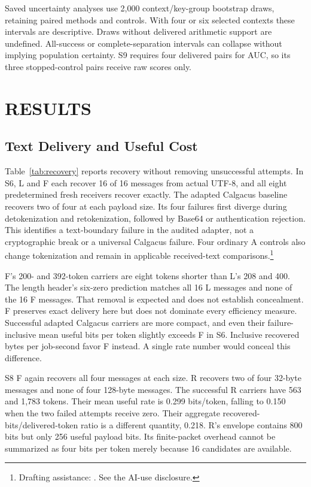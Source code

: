 \documentclass[a4paper,twoside]{article}
\newcommand{\aidraft}{\footnote{Drafting assistance: \cite{openai2026codex}. See the AI-use disclosure.}}
\begin{document}
Saved uncertainty analyses use 2,000 context/key-group bootstrap draws, retaining paired methods and controls. With four or six selected contexts these intervals are descriptive. Draws without delivered arithmetic support are undefined. All-success or complete-separation intervals can collapse without implying population certainty. S9 requires four delivered pairs for AUC, so its three stopped-control pairs receive raw scores only.

\section{RESULTS}
\label{sec:results}
\subsection{Text Delivery and Useful Cost}
\noindent Table~\ref{tab:recovery} reports recovery without removing unsuccessful attempts. In S6, L and F each recover 16 of 16 messages from actual UTF-8, and all eight predetermined fresh receivers recover exactly. The adapted Calgacus baseline recovers two of four at each payload size. Its four failures first diverge during detokenization and retokenization, followed by Base64 or authentication rejection. This identifies a text-boundary failure in the audited adapter, not a cryptographic break or a universal Calgacus failure. Four ordinary A controls also change tokenization and remain in applicable received-text comparisons.\aidraft



F's 200- and 392-token carriers are eight tokens shorter than L's 208 and 400. The length header's six-zero prediction matches all 16 L messages and none of the 16 F messages. That removal is expected and does not establish concealment. F preserves exact delivery here but does not dominate every efficiency measure. Successful adapted Calgacus carriers are more compact, and even their failure-inclusive mean useful bits per token slightly exceeds F in S6. Inclusive recovered bytes per job-second favor F instead. A single rate number would conceal this difference.

S8 F again recovers all four messages at each size. R recovers two of four 32-byte messages and none of four 128-byte messages. The successful R carriers have 563 and 1,783 tokens. Their mean useful rate is 0.299 bits/token, falling to 0.150 when the two failed attempts receive zero. Their aggregate recovered-bits/delivered-token ratio is a different quantity, 0.218. R's envelope contains 800 bits but only 256 useful payload bits. Its finite-packet overhead cannot be summarized as four bits per token merely because 16 candidates are available.
\end{document}
